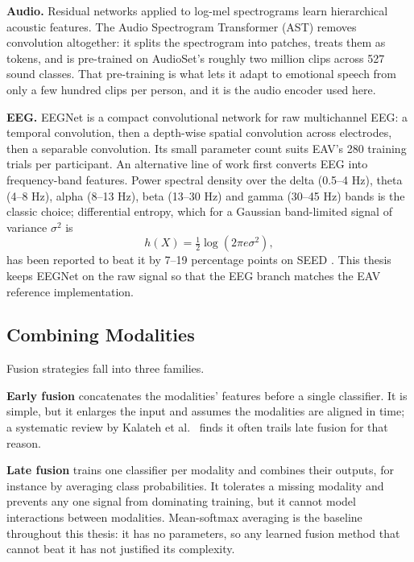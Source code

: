 \textbf{Audio.} Residual networks applied to log-mel spectrograms \cite{He2016ResNet} learn hierarchical acoustic features. The Audio Spectrogram Transformer (AST) \cite{Gong2021AST} removes convolution altogether: it splits the spectrogram into patches, treats them as tokens, and is pre-trained on AudioSet's roughly two million clips across 527 sound classes. That pre-training is what lets it adapt to emotional speech from only a few hundred clips per person, and it is the audio encoder used here.

\textbf{EEG.} EEGNet \cite{Lawhern2018EEGNet} is a compact convolutional network for raw multichannel EEG: a temporal convolution, then a depth-wise spatial convolution across electrodes, then a separable convolution. Its small parameter count suits EAV's 280 training trials per participant. An alternative line of work first converts EEG into frequency-band features. Power spectral density over the delta (0.5--4 Hz), theta (4--8 Hz), alpha (8--13 Hz), beta (13--30 Hz) and gamma (30--45 Hz) bands is the classic choice; differential entropy, which for a Gaussian band-limited signal of variance $\sigma^2$ is
\begin{equation}
    h(X) = \tfrac{1}{2}\log(2\pi e\sigma^2),
\end{equation}
has been reported to beat it by 7--19 percentage points on SEED \cite{Zheng2015SEED}. This thesis keeps EEGNet on the raw signal so that the EEG branch matches the EAV reference implementation.

\subsection{Combining Modalities}
Fusion strategies fall into three families.

\textbf{Early fusion} concatenates the modalities' features before a single classifier. It is simple, but it enlarges the input and assumes the modalities are aligned in time; a systematic review by Kalateh et al.\ \cite{Kalateh2024SystematicReview} finds it often trails late fusion for that reason.

\textbf{Late fusion} trains one classifier per modality and combines their outputs, for instance by averaging class probabilities. It tolerates a missing modality and prevents any one signal from dominating training, but it cannot model interactions between modalities. Mean-softmax averaging is the baseline throughout this thesis: it has no parameters, so any learned fusion method that cannot beat it has not justified its complexity.

